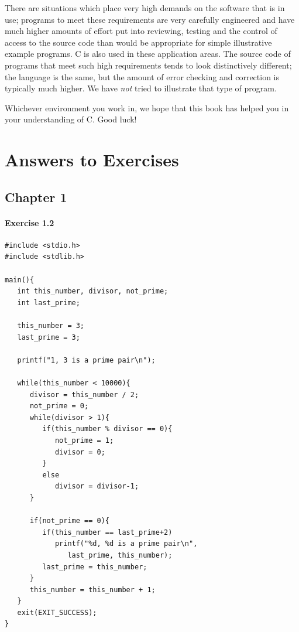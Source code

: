  There are situations which place very high demands on the software that
   is in use; programs to meet these requirements are very carefully
   engineered and have much higher amounts of effort put into reviewing,
   testing and the control of access to the source code than would be
   appropriate for simple illustrative example programs. C is also used in
   these application areas.  The source code of programs that meet such high
   requirements tends to look distinctively different; the language is the
   same, but the amount of error checking and correction is typically much
   higher. We have \textit{not} tried to illustrate that type of
   program.


  Whichever environment you work in, we hope that this book has helped
   you in your understanding of C. Good luck!


 \chapter*{Answers to Exercises}


        \section*{Chapter 1}
        

  

  \subsubsection*{Exercise 1.2}

   \begin{Verbatim}
#include <stdio.h>
#include <stdlib.h>

main(){
   int this_number, divisor, not_prime;
   int last_prime;

   this_number = 3;
   last_prime = 3;

   printf("1, 3 is a prime pair\n");

   while(this_number < 10000){
      divisor = this_number / 2;
      not_prime = 0;
      while(divisor > 1){
         if(this_number % divisor == 0){
            not_prime = 1;
            divisor = 0;
         }
         else
            divisor = divisor-1;
      }

      if(not_prime == 0){
         if(this_number == last_prime+2)
            printf("%d, %d is a prime pair\n",
               last_prime, this_number);
         last_prime = this_number;
      }
      this_number = this_number + 1;
   }
   exit(EXIT_SUCCESS);
}
\end{Verbatim}


